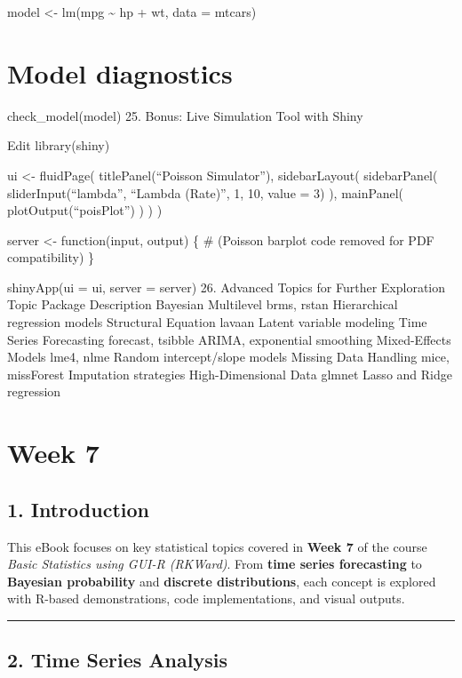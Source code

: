 \documentclass[
  letterpaper,
  DIV=11,
  numbers=noendperiod]{scrreprt}
\begin{document}
{model \textless- lm(mpg \textasciitilde{} hp + wt, data = mtcars)


\chapter{Model diagnostics}\label{model-diagnostics}

check\_model(model) 25. Bonus: Live Simulation Tool with Shiny

Edit library(shiny)

ui \textless- fluidPage( titlePanel(``Poisson Simulator''),
sidebarLayout( sidebarPanel( sliderInput(``lambda'', ``Lambda (Rate)'',
1, 10, value = 3) ), mainPanel( plotOutput(``poisPlot'') ) ) )

server \textless- function(input, output) \{ \# (Poisson barplot code
removed for PDF compatibility) \}

shinyApp(ui = ui, server = server) 26. Advanced Topics for Further
Exploration Topic Package Description Bayesian Multilevel brms, rstan
Hierarchical regression models Structural Equation lavaan Latent
variable modeling Time Series Forecasting forecast, tsibble ARIMA,
exponential smoothing Mixed-Effects Models lme4, nlme Random
intercept/slope models Missing Data Handling mice, missForest Imputation
strategies High-Dimensional Data glmnet Lasso and Ridge regression


\chapter{Week 7}\label{week-7}

\section{1. Introduction}\label{introduction-6}

This eBook focuses on key statistical topics covered in \textbf{Week 7}
of the course \emph{Basic Statistics using GUI-R (RKWard)}. From
\textbf{time series forecasting} to \textbf{Bayesian probability} and
\textbf{discrete distributions}, each concept is explored with R-based
demonstrations, code implementations, and visual outputs.

\begin{center}\rule{0.5\linewidth}{0.5pt}\end{center}

\section{2. Time Series Analysis}\label{time-series-analysis}

}
\end{document}
